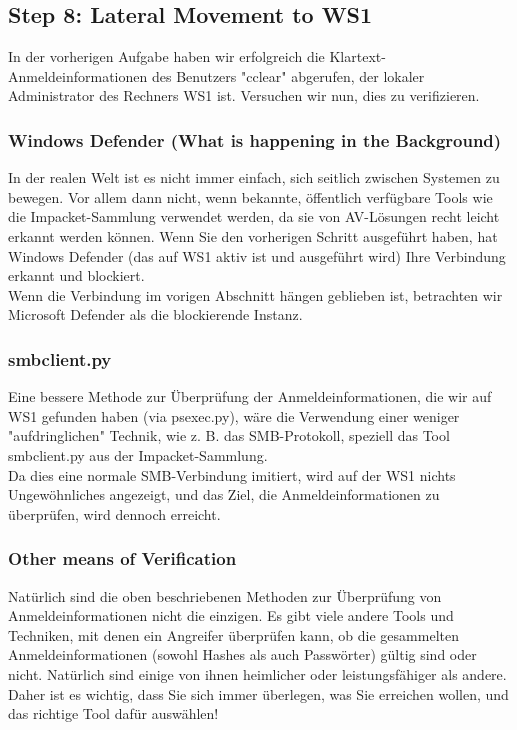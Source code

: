 \subsection{Step 8: Lateral Movement to WS1}
In der vorherigen Aufgabe haben wir erfolgreich die Klartext-Anmeldeinformationen des Benutzers "cclear" abgerufen, der lokaler Administrator des Rechners WS1 ist. Versuchen wir nun, dies zu verifizieren.

\subsubsection{Windows Defender (What is happening in the Background)}
In der realen Welt ist es nicht immer einfach, sich seitlich zwischen Systemen zu bewegen. Vor allem dann nicht, wenn bekannte, öffentlich verfügbare Tools wie die Impacket-Sammlung verwendet werden, da sie von AV-Lösungen recht leicht erkannt werden können. Wenn Sie den vorherigen Schritt ausgeführt haben, hat Windows Defender (das auf WS1 aktiv ist und ausgeführt wird) Ihre Verbindung erkannt und blockiert.\\

Wenn die Verbindung im vorigen Abschnitt hängen geblieben ist, betrachten wir Microsoft Defender als die blockierende Instanz.

\subsubsection{smbclient.py}
Eine bessere Methode zur Überprüfung der Anmeldeinformationen, die wir auf WS1 gefunden haben (via psexec.py), wäre die Verwendung einer weniger "aufdringlichen" Technik, wie z. B. das SMB-Protokoll, speziell das Tool smbclient.py aus der Impacket-Sammlung.\\

Da dies eine normale SMB-Verbindung imitiert, wird auf der WS1 nichts Ungewöhnliches angezeigt, und das Ziel, die Anmeldeinformationen zu überprüfen, wird dennoch erreicht.

\subsubsection{Other means of Verification}
Natürlich sind die oben beschriebenen Methoden zur Überprüfung von Anmeldeinformationen nicht die einzigen. Es gibt viele andere Tools und Techniken, mit denen ein Angreifer überprüfen kann, ob die gesammelten Anmeldeinformationen (sowohl Hashes als auch Passwörter) gültig sind oder nicht. Natürlich sind einige von ihnen heimlicher oder leistungsfähiger als andere. Daher ist es wichtig, dass Sie sich immer überlegen, was Sie erreichen wollen, und das richtige Tool dafür auswählen!

